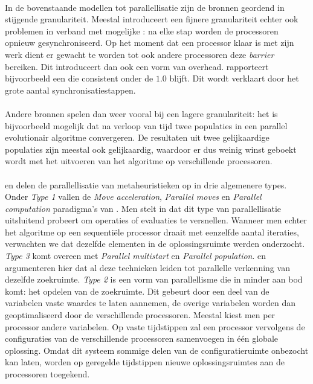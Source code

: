 \paragraph{}
In de bovenstaande modellen tot parallellisatie zijn de bronnen geordend in stijgende granulariteit. Meestal introduceert een fijnere granulariteit echter ook problemen in verband met mogelijke \absu{}: na elke stap worden de processoren opnieuw gesynchroniseerd. Op het moment dat een processor klaar is met zijn werk dient er gewacht te worden tot ook andere processoren deze \emph{barrier} bereiken. Dit introduceert dan ook een vorm van overhead. \cite{conf/glvlsi/HaldarNCB00} rapporteert bijvoorbeeld een \absu{} die consistent onder de $1.0$ blijft. Dit wordt verklaart door het grote aantal synchronisatiestappen.

\paragraph{}
Andere bronnen spelen dan weer vooral bij een lagere granulariteit: het is bijvoorbeeld mogelijk dat na verloop van tijd twee populaties in een parallel evolutionair algoritme convergeren. De resultaten uit twee gelijkaardige populaties zijn meestal ook gelijkaardig, waardoor er dus weinig winst geboekt wordt met het uitvoeren van het algoritme op verschillende processoren.

\paragraph{}
 en \cite{crainicAndToulouse} delen de parallellisatie van metaheuristieken op in drie algemenere types. Onder \emph{Type 1} vallen de \emph{Move acceleration}, \emph{Parallel moves} en \emph{Parallel computation} paradigma's van . Men stelt in\cite{crainicAndToulouse} dat dit type van parallellisatie uitsluitend probeert om operaties of evaluaties te versnellen. Wanneer men echter het algoritme op een sequenti\"ele processor draait met eenzelfde aantal iteraties, verwachten we dat dezelfde elementen in de oplossingsruimte werden onderzocht. \emph{Type 3} komt overeen met \emph{Parallel multistart} en \emph{Parallel population}.  en  argumenteren hier dat al deze technieken leiden tot parallelle verkenning van dezelfde zoekruimte. \emph{Type 2} is een vorm van parallellisme die in  minder aan bod komt: het opdelen van de zoekruimte. Dit gebeurt door een deel van de variabelen vaste waardes te laten aannemen, de overige variabelen worden dan geoptimaliseerd door de verschillende processoren. Meestal kiest men per processor andere variabelen. Op vaste tijdstippen zal een processor vervolgens de configuraties van de verschillende processoren samenvoegen in \'e\'en globale oplossing. Omdat dit systeem sommige delen van de configuratieruimte onbezocht kan laten, worden op geregelde tijdstippen nieuwe oplossingsruimtes aan de processoren toegekend.

